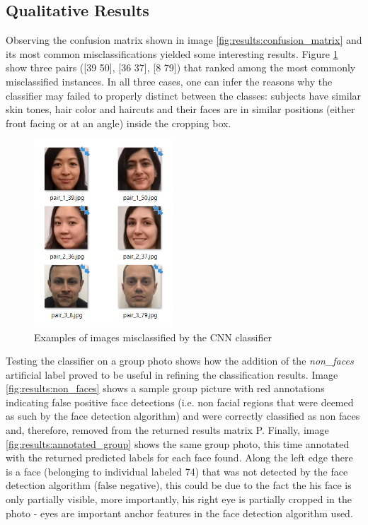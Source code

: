 \documentclass[11pt]{article}
\begin{document}
    \subsection{Qualitative Results}
        Observing the confusion matrix shown in image \ref{fig:results:confusion_matrix} and its most common misclassifications yielded some interesting results. Figure \ref{fig:results:confusion_samples} show three pairs ([39 50], [36 37],  [8 79]) that ranked among the most commonly misclassified instances. In all three cases, one can infer the reasons why the classifier may failed to properly distinct between the classes: subjects have similar skin tones, hair color and haircuts and their faces are in similar positions (either front facing or at an angle) inside the cropping box.

        \begin{figure}[t]
            \centering
            \includegraphics[height=7cm]{./Images/results/confusion_samples.png}
            \caption{Examples of images misclassified by the CNN classifier}
            \label{fig:results:confusion_samples}
        \end{figure}

        Testing the classifier on a group photo shows how the addition of the \textit{non\_faces} artificial label proved to be useful in refining the classification results. Image \ref{fig:results:non_faces} shows a sample group picture with red annotations indicating false positive face detections (i.e. non facial regions that were deemed as such by the face detection algorithm) and were correctly classified as non faces and, therefore, removed from the returned results matrix P.
        Finally, image \ref{fig:results:annotated_group} shows the same group photo, this time annotated with the returned predicted labels for each face found. Along the left edge there is a face (belonging to individual labeled 74) that was not detected by the face detection algorithm (false negative), this could be due to the fact the his face is only partially visible, more importantly, his right eye is partially cropped in the photo - eyes are important anchor features in the face detection algorithm used.
\end{document}
